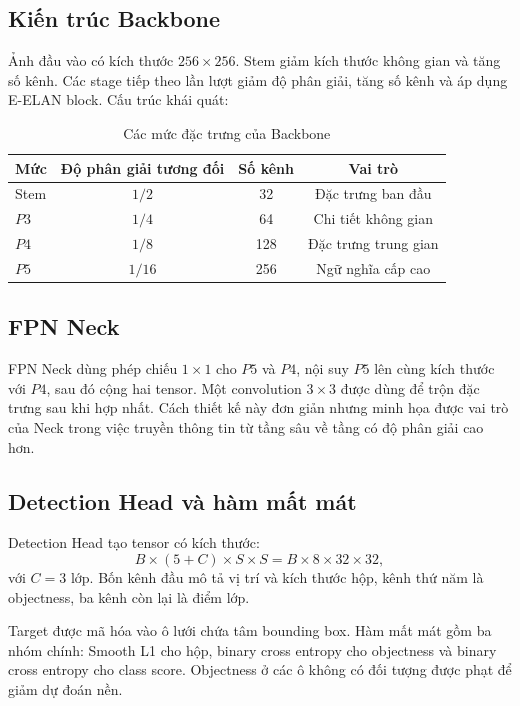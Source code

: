 \documentclass[12pt,a4paper]{article}
\begin{document}
\subsection{Kiến trúc Backbone}

Ảnh đầu vào có kích thước $256\times256$. Stem giảm kích thước không gian và tăng số kênh. Các stage tiếp theo lần lượt giảm độ phân giải, tăng số kênh và áp dụng E-ELAN block. Cấu trúc khái quát:

\begin{table}[H]
\centering
\caption{Các mức đặc trưng của Backbone}
\begin{tabular}{lccc}
\toprule
\textbf{Mức} & \textbf{Độ phân giải tương đối} & \textbf{Số kênh} & \textbf{Vai trò}\\
\midrule
Stem & $1/2$ & 32 & Đặc trưng ban đầu\\
$P3$ & $1/4$ & 64 & Chi tiết không gian\\
$P4$ & $1/8$ & 128 & Đặc trưng trung gian\\
$P5$ & $1/16$ & 256 & Ngữ nghĩa cấp cao\\
\bottomrule
\end{tabular}
\end{table}

\subsection{FPN Neck}

FPN Neck dùng phép chiếu $1\times1$ cho $P5$ và $P4$, nội suy $P5$ lên cùng kích thước với $P4$, sau đó cộng hai tensor. Một convolution $3\times3$ được dùng để trộn đặc trưng sau khi hợp nhất. Cách thiết kế này đơn giản nhưng minh họa được vai trò của Neck trong việc truyền thông tin từ tầng sâu về tầng có độ phân giải cao hơn.

\subsection{Detection Head và hàm mất mát}

Detection Head tạo tensor có kích thước:
\[
B\times(5+C)\times S\times S
= B\times8\times32\times32,
\]
với $C=3$ lớp. Bốn kênh đầu mô tả vị trí và kích thước hộp, kênh thứ năm là objectness, ba kênh còn lại là điểm lớp.

Target được mã hóa vào ô lưới chứa tâm bounding box. Hàm mất mát gồm ba nhóm chính: Smooth L1 cho hộp, binary cross entropy cho objectness và binary cross entropy cho class score. Objectness ở các ô không có đối tượng được phạt để giảm dự đoán nền.
\end{document}
